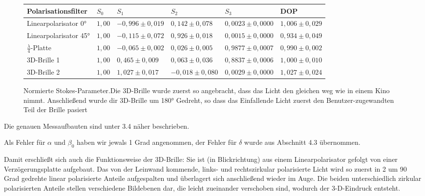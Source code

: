 \documentclass[bigchapter,colorback,accentcolor=tud4b,linedtoc,11pt]{tudreport}
\begin{document}
\begin{figure}[h]
  \begin{center}
    \begin{tabular}{|p{3.6cm}|p{0.9cm}|p{2.7cm}|p{2.7cm}|p{2.7cm}|p{2.3cm}|}
      \hline
      Polarisationsfilter        & $S_0$   & $S_1$              & $S_2$              & $S_3$               & DOP               \\ \hline
      Linearpolarisator 0°       & $1,00 $ & $-0,996 \pm 0,019$ & $0,142 \pm 0,078$  & $0,0023 \pm 0,0000$ & $1,006 \pm 0,029$ \\ \hline
      Linearpolarisator 45°      & $1,00 $ & $-0,115 \pm 0,072$ & $0,926 \pm 0,018$  & $0,0015 \pm 0,0000$ & $0,934 \pm 0,049$ \\ \hline
      $\frac{\lambda}{4}$-Platte & $1,00 $ & $-0,065 \pm 0,002$ & $0,026 \pm 0,005$  & $0,9877 \pm 0,0007$ & $0,990 \pm 0,002$ \\ \hline
      3D-Brille 1                & $1,00 $ & $0,465 \pm 0,009$  & $0,063 \pm 0,036$  & $0,8837 \pm 0,0006$ & $1,000 \pm 0,010$ \\ \hline
      3D-Brille 2                & $1,00 $ & $1,027 \pm 0,017$  & $-0,018 \pm 0,080$ & $0,0029 \pm 0,0000$ & $1,027 \pm 0,024$ \\ \hline
    \end{tabular}
  \end{center}
  \caption{Normierte Stokes-Parameter.Die 3D-Brille wurde zuerst so angebracht, dass das Licht den gleichen weg wie in einem Kino nimmt. Anschließend wurde dir 3D-Brille um 180° Gedreht, so dass das Einfallende Licht zuerst den Benutzer-zugewandten Teil der Brille pasiert}
\end{figure}

Die genauen Messaufbauten sind unter 3.4 näher beschrieben.

Als Fehler für $\alpha$ und $\beta_0$ haben wir jewals 1 Grad angenommen, der Fehler für $\delta$ wurde aus Abschnitt 4.3 übernommen.

Damit erschließt sich auch die Funktionsweise der 3D-Brille:
Sie ist (in Blickrichtung) aus einem Linearpolarisator gefolgt von einer Verzögerungsplatte aufgebaut. Das von der Leinwand kommende, links- und rechtszirkular polarisierte Licht wird so zuerst in 2 um 90 Grad gedrehte linear polarisierte Anteile aufgespalten und überlagert sich anschließend wieder im Auge. Die beiden unterschiedlich zirkular polarisierten Anteile stellen verschiedene Bildebenen dar, die leicht zueinander verschoben sind, wodurch der 3-D-Eindruck entsteht.
\end{document}
